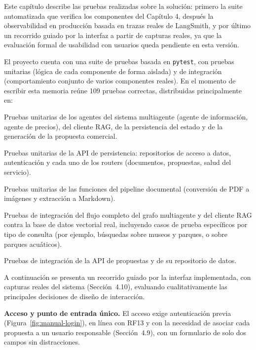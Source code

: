 \clearpage
{}
Este capítulo describe las pruebas realizadas sobre la solución: primero la suite automatizada que verifica los componentes del Capítulo 4, después la observabilidad en producción basada en trazas reales de LangSmith, y por último un recorrido guiado por la interfaz a partir de capturas reales, ya que la evaluación formal de usabilidad con usuarios queda pendiente en esta versión.

El proyecto cuenta con una suite de pruebas basada en \texttt{pytest}, con pruebas unitarias (lógica de cada componente de forma aislada) y de integración (comportamiento conjunto de varios componentes reales). En el momento de escribir esta memoria reúne 109 pruebas correctas, distribuidas principalmente en:

\begin{tfmbullets}
\item Pruebas unitarias de los agentes del sistema multiagente (agente de información, agente de precios), del cliente RAG, de la persistencia del estado y de la generación de la propuesta comercial.
\item Pruebas unitarias de la API de persistencia: repositorios de acceso a datos, autenticación y cada uno de los routers (documentos, propuestas, salud del servicio).
\item Pruebas unitarias de las funciones del pipeline documental (conversión de PDF a imágenes y extracción a Markdown).
\item Pruebas de integración del flujo completo del grafo multiagente y del cliente RAG contra la base de datos vectorial real, incluyendo casos de prueba específicos por tipo de consulta (por ejemplo, búsquedas sobre museos y parques, o sobre parques acuáticos).
\item Pruebas de integración de la API de propuestas y de su repositorio de datos.
\end{tfmbullets}


A continuación se presenta un recorrido guiado por la interfaz implementada, con capturas reales del sistema (Sección~4.10), evaluando cualitativamente las principales decisiones de diseño de interacción.

\textbf{Acceso y punto de entrada único.} El acceso exige autenticación previa (Figura~\ref{fig:manual-login}), en línea con RF13 y con la necesidad de asociar cada propuesta a un usuario responsable (Sección~4.9), con un formulario de solo dos campos sin distracciones.

